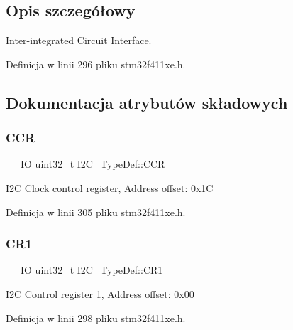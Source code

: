 \subsection{Opis szczegółowy}
Inter-\/integrated Circuit Interface. 

Definicja w linii 296 pliku stm32f411xe.\+h.



\subsection{Dokumentacja atrybutów składowych}
\mbox{\label{struct_i2_c___type_def_a4d81b61d23a54d0d1e28646c3bb9aac5}} 
\subsubsection{\texorpdfstring{C\+CR}{CCR}}
{\footnotesize\ttfamily \hyperlink{core__sc300_8h_aec43007d9998a0a0e01faede4133d6be}{\+\_\+\+\_\+\+IO} uint32\+\_\+t I2\+C\+\_\+\+Type\+Def\+::\+C\+CR}

I2C Clock control register, Address offset\+: 0x1C 

Definicja w linii 305 pliku stm32f411xe.\+h.

\mbox{\label{struct_i2_c___type_def_a91782f7b81475b0e3c3779273abd26aa}} 
\subsubsection{\texorpdfstring{C\+R1}{CR1}}
{\footnotesize\ttfamily \hyperlink{core__sc300_8h_aec43007d9998a0a0e01faede4133d6be}{\+\_\+\+\_\+\+IO} uint32\+\_\+t I2\+C\+\_\+\+Type\+Def\+::\+C\+R1}

I2C Control register 1, Address offset\+: 0x00 

Definicja w linii 298 pliku stm32f411xe.\+h.

\mbox{\label{struct_i2_c___type_def_a29eb47db03d5ad7e9b399f8895f1768c}} 

